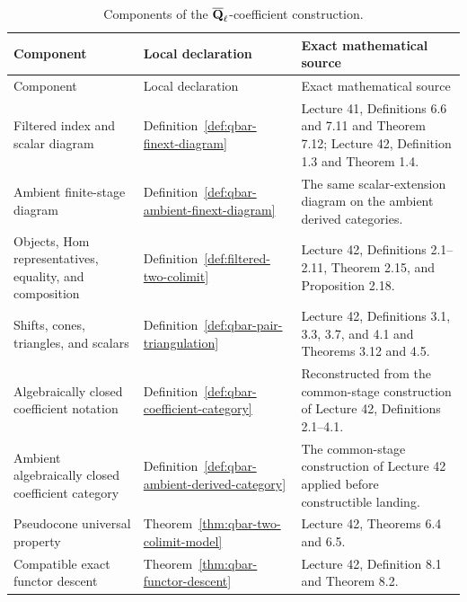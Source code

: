 \clearpage
\begin{longtable}{@{}
>{\raggedright\arraybackslash}p{}
>{\raggedright\arraybackslash}p{}
>{\raggedright\arraybackslash}p{}@{}}
\caption{Components of the \(\overline{\mathbf Q}_\ell\)-coefficient construction.}
\label{tab:qbar-two-colimit-sources}\\
\toprule
Component & Local declaration & Exact mathematical source\\
\midrule
\endfirsthead
\toprule
Component & Local declaration & Exact mathematical source\\
\midrule
\endhead
Filtered index and scalar diagram &
Definition~\ref{def:qbar-finext-diagram} &
Lecture 41, Definitions 6.6 and 7.11 and Theorem 7.12; Lecture 42,
Definition 1.3 and Theorem 1.4.\\
Ambient finite-stage diagram &
Definition~\ref{def:qbar-ambient-finext-diagram} &
The same scalar-extension diagram on the ambient derived categories.\\
Objects, Hom representatives, equality, and composition &
Definition~\ref{def:filtered-two-colimit} &
Lecture 42, Definitions 2.1--2.11, Theorem 2.15, and Proposition 2.18.\\
Shifts, cones, triangles, and scalars &
Definition~\ref{def:qbar-pair-triangulation} &
Lecture 42, Definitions 3.1, 3.3, 3.7, and 4.1 and Theorems 3.12 and 4.5.\\
Algebraically closed coefficient notation &
Definition~\ref{def:qbar-coefficient-category} &
Reconstructed from the common-stage construction of Lecture 42,
Definitions 2.1--4.1.\\
Ambient algebraically closed coefficient category &
Definition~\ref{def:qbar-ambient-derived-category} &
The common-stage construction of Lecture 42 applied before constructible
landing.\\
Pseudocone universal property &
Theorem~\ref{thm:qbar-two-colimit-model} &
Lecture 42, Theorems 6.4 and 6.5.\\
Compatible exact functor descent &
Theorem~\ref{thm:qbar-functor-descent} &
Lecture 42, Definition 8.1 and Theorem 8.2.\\
\bottomrule
\end{longtable}

